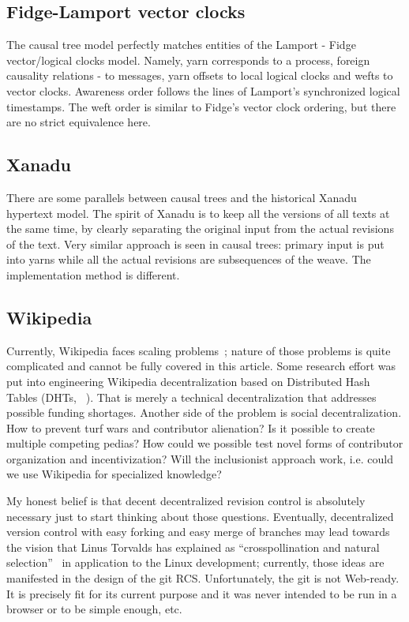 \documentclass{acm_proc_article-sp}
\begin{document}
\subsection{Fidge-Lamport vector clocks} \label{sec:lamport}

The causal tree model perfectly matches entities of the
Lamport - Fidge~\cite{lamport,fidge} vector/logical clocks model.
Namely, yarn
corresponds to a process, foreign causality relations - to
messages, yarn offsets to local logical clocks and wefts to
vector clocks. 
Awareness order follows the lines of Lamport's synchronized
logical timestamps. The weft order is similar to Fidge's vector
clock ordering, but there are no strict equivalence here.

\subsection{Xanadu}

There are some parallels between causal trees and the historical
Xanadu hypertext model. The spirit of Xanadu is to keep all the
versions of all texts at the same time, by clearly separating the
original input from the actual revisions of the text. Very similar 
approach is seen in causal trees: primary input is put into yarns
while all the actual revisions are subsequences of the weave.
The implementation method is different.

\subsection{Wikipedia}

Currently, Wikipedia faces scaling problems~\cite{no-singularity,wp-decay};
nature of those problems is quite complicated and cannot be fully
covered in this article. Some research effort was put into
engineering Wikipedia decentralization based on Distributed
Hash Tables (DHTs, ~\cite{urdaneta}). That is merely a
technical decentralization that addresses possible funding
shortages. Another side of the problem is social decentralization.
How to prevent turf wars and contributor alienation? Is it
possible to create multiple competing pedias? How could we
possible test novel forms of contributor organization and
incentivization? Will the inclusionist approach work, i.e.
could we use Wikipedia for specialized knowledge?

My honest belief is that decent decentralized revision control
is absolutely necessary just to start thinking about those
questions. Eventually, decentralized version control with
easy forking and easy merge of branches may lead towards the
vision that Linus Torvalds has explained as ``crosspollination
and natural selection''~\cite{linus-pollinates}
in application to the Linux development;
currently, those ideas are manifested in the design of the git RCS.
Unfortunately, the git is not Web-ready. It is precisely fit
for its current purpose and it was never intended to be run
in a browser or to be simple enough, etc.
\end{document}
